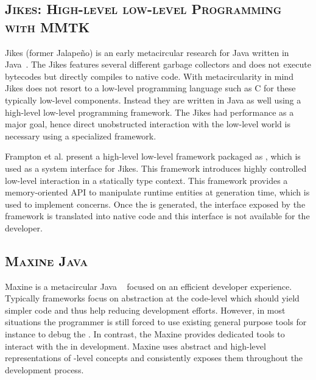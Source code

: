 \subsection*{\textsc{Jikes: High-level low-level Programming with MMTK}}
Jikes (former Jalapeño) is an early metacircular research \VM for Java written in Java~\cite{Alpe00a}.
The Jikes \VM features several different garbage collectors and does not execute bytecodes but directly compiles to native code.
With metacircularity in mind Jikes does not resort to a low-level programming language such as C for these typically low-level \VM components.
Instead they are written in Java as well using a high-level low-level programming framework.
The Jikes \VM had performance as a major goal, hence direct unobstructed interaction with the low-level world is necessary using a specialized framework.

Frampton et al. present a high-level low-level framework packaged as , which is used as a system interface for Jikes. This framework introduces highly controlled low-level interaction in a statically type context. This framework provides a memory-oriented API to manipulate runtime entities at \VM generation time, which is used to implement \VM concerns. Once the \VM is generated, the interface exposed by the  framework is translated into native code and this interface is not available for the developer.


\subsection*{\textsc{Maxine Java \VM}}
Maxine is a metacircular Java \VM~\cite{Wimm13a} focused on an efficient developer experience.
Typically \VM frameworks focus on abstraction at the code-level which should yield simpler code and thus help reducing development efforts.
However, in most situations the programmer is still forced to use existing general purpose tools for instance to debug the \VM.
In contrast, the Maxine \VM provides dedicated tools to interact with the \VM in development.
Maxine uses abstract and high-level representations of \VM-level concepts and consistently exposes them throughout the development process.

